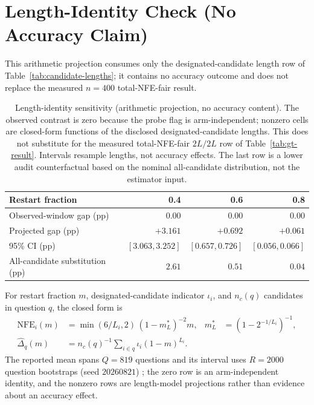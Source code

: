 \section{Length-Identity Check (No Accuracy Claim)}
\label{app:projestimator}

This arithmetic projection consumes only the designated-candidate length row
of Table~\ref{tab:candidate-lengths}; it contains no accuracy outcome and does
not replace the measured $n{=}400$ total-NFE-fair result.

\begin{table}[H]
\centering
\footnotesize
\setlength{\tabcolsep}{5pt}
\caption{Length-identity sensitivity (arithmetic projection, no accuracy
content).  The observed contrast is zero because the probe flag is
arm-independent; nonzero cells are closed-form functions of the disclosed
designated-candidate lengths.  This does not substitute for the measured
total-NFE-fair $2L/2L$ row of Table~\ref{tab:gt-result}.  Intervals resample lengths, not
accuracy effects.  The last row is a lower audit counterfactual based on the
nominal all-candidate distribution, not the estimator input.}
\label{tab:nfe-sensitivity}
\begin{tabular}{@{}lrrr@{}}
\toprule
Restart fraction & 0.4 & 0.6 & 0.8 \\
\midrule
Observed-window gap (pp) & 0.00 & 0.00 & 0.00 \\
Projected gap (pp) & $+3.161$ & $+0.692$ & $+0.061$ \\
95\% CI (pp) & $[3.063,3.252]$ & $[0.657,0.726]$ & $[0.056,0.066]$ \\
\midrule
All-candidate substitution (pp) & $2.61$ & $0.51$ & $0.04$ \\
\bottomrule
\end{tabular}
\end{table}

For restart fraction $m$, designated-candidate indicator $\iota_i$, and
$n_c(q)$ candidates in question $q$, the closed form is
\begin{align*}
\mathrm{NFE}_i(m)&=\min(6/L_i,2)\,(1-m_L^*)^{-2}m,
&m_L^*&=(1-2^{-1/L_i})^{-1},\\
\widehat\Delta_q(m)&=n_c(q)^{-1}\sum_{i\in q}\iota_i(1-m)^{L_i}.&&
\end{align*}
The reported mean spans $Q{=}819$ questions and its interval uses $R{=}2000$
question bootstraps (seed $20260821$) \citep{efron1994bootstrap}; the zero row
is an arm-independent identity, and the nonzero rows are length-model
projections rather than evidence about an accuracy effect.

